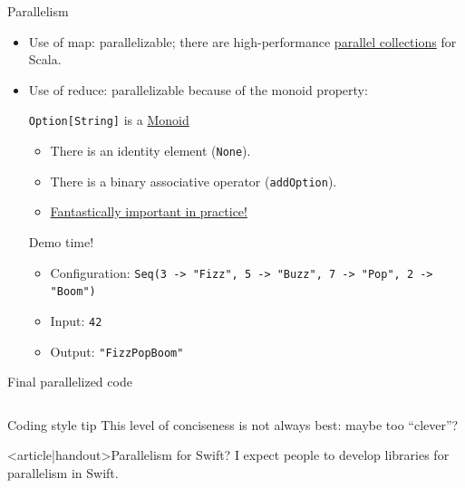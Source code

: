 \begin{frame}[fragile]{Parallelism}
  \begin{itemize}
  \item Use of \alert{map}: parallelizable; there are high-performance \href{http://scala-blitz.github.io/}{parallel collections} for Scala.
  \item Use of \alert{reduce}: parallelizable because of the monoid property:
  \begin{block}{\texttt{Option[String]} is a \href{http://en.wikipedia.org/wiki/Monoid}{Monoid}}
  \begin{itemize}
  \item There is an identity element (\texttt{None}).
  \item There is a binary associative operator (\texttt{addOption}).
  \item \href{http://www.michael-noll.com/blog/2013/12/02/twitter-algebird-monoid-monad-for-large-scala-data-analytics/}{Fantastically important in practice!}
  \end{itemize}
  \end{block}

  \begin{block}{Demo time!}
    \begin{itemize}
    \item Configuration: \texttt{Seq(3 -> "Fizz", 5 -> "Buzz", 7 -> "Pop", 2 -> "Boom")}
    \item Input: \texttt{42}
    \item Output: \texttt{"FizzPopBoom"}
    \end{itemize}
  \end{block}
  \end{itemize}

\end{frame}

\begin{frame}[fragile]{Final parallelized code}
  \inputminted[gobble=2]{scala}{FizzBuzz9.scala}

  \begin{block}{Coding style tip}
    This level of conciseness is not always best: maybe too ``clever''?
  \end{block}
\end{frame}

\begin{frame}<article|handout>{Parallelism for Swift?}
  I expect people to develop libraries for parallelism in Swift.
\end{frame}

